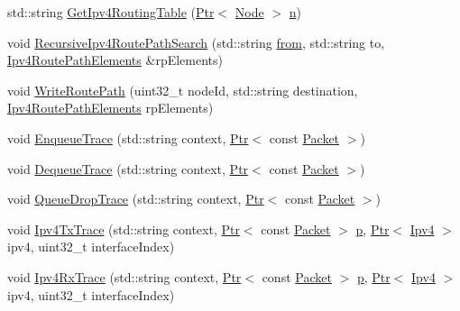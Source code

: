 \begin{DoxyCompactItemize}
std\+::string \hyperlink{classns3_1_1AnimationInterface_ab0c4d9a8eeca65918081b8f228e135e8}{Get\+Ipv4\+Routing\+Table} (\hyperlink{classns3_1_1Ptr}{Ptr}$<$ \hyperlink{classns3_1_1Node}{Node} $>$ \hyperlink{lte__link__budget__x2__handover__measures_8m_abdb05bc5a064cf642a06c83b3392f148}{n})
\item 
void \hyperlink{classns3_1_1AnimationInterface_acbffe52eaabf803a624ba0452b226017}{Recursive\+Ipv4\+Route\+Path\+Search} (std\+::string \hyperlink{lte__amc_8m_a1b4c81ff74eb1a626b5ade44c81004b3}{from}, std\+::string to, \hyperlink{classns3_1_1AnimationInterface_a7c7711cf651506df80a9eb3026603c52}{Ipv4\+Route\+Path\+Elements} \&rp\+Elements)
\item 
void \hyperlink{classns3_1_1AnimationInterface_a372eeb3ffb6c70549acfe075d1725721}{Write\+Route\+Path} (uint32\+\_\+t node\+Id, std\+::string destination, \hyperlink{classns3_1_1AnimationInterface_a7c7711cf651506df80a9eb3026603c52}{Ipv4\+Route\+Path\+Elements} rp\+Elements)
\item 
void \hyperlink{classns3_1_1AnimationInterface_ab44b5fe960865d3da6fec1fabb2a6416}{Enqueue\+Trace} (std\+::string context, \hyperlink{classns3_1_1Ptr}{Ptr}$<$ const \hyperlink{classns3_1_1Packet}{Packet} $>$)
\item 
void \hyperlink{classns3_1_1AnimationInterface_a3338ee557373400f3ca037da281b13d5}{Dequeue\+Trace} (std\+::string context, \hyperlink{classns3_1_1Ptr}{Ptr}$<$ const \hyperlink{classns3_1_1Packet}{Packet} $>$)
\item 
void \hyperlink{classns3_1_1AnimationInterface_afa6b75f93825dec85b110cc9461815c0}{Queue\+Drop\+Trace} (std\+::string context, \hyperlink{classns3_1_1Ptr}{Ptr}$<$ const \hyperlink{classns3_1_1Packet}{Packet} $>$)
\item 
void \hyperlink{classns3_1_1AnimationInterface_ab1fb263492489097f6bdbf1f1f1e1342}{Ipv4\+Tx\+Trace} (std\+::string context, \hyperlink{classns3_1_1Ptr}{Ptr}$<$ const \hyperlink{classns3_1_1Packet}{Packet} $>$ \hyperlink{lte__link__budget__x2__handover__measures_8m_ac9de518908a968428863f829398a4e62}{p}, \hyperlink{classns3_1_1Ptr}{Ptr}$<$ \hyperlink{classns3_1_1Ipv4}{Ipv4} $>$ ipv4, uint32\+\_\+t interface\+Index)
\item 
void \hyperlink{classns3_1_1AnimationInterface_a6fcd3f147e2c1a6216c1644e36c4ca7e}{Ipv4\+Rx\+Trace} (std\+::string context, \hyperlink{classns3_1_1Ptr}{Ptr}$<$ const \hyperlink{classns3_1_1Packet}{Packet} $>$ \hyperlink{lte__link__budget__x2__handover__measures_8m_ac9de518908a968428863f829398a4e62}{p}, \hyperlink{classns3_1_1Ptr}{Ptr}$<$ \hyperlink{classns3_1_1Ipv4}{Ipv4} $>$ ipv4, uint32\+\_\+t interface\+Index)

\end{DoxyCompactItemize}
